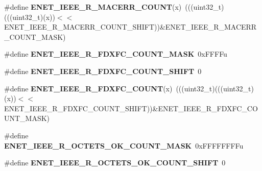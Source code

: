 \begin{DoxyCompactItemize}
\item 
\#define {\bfseries E\+N\+E\+T\+\_\+\+I\+E\+E\+E\+\_\+\+R\+\_\+\+M\+A\+C\+E\+R\+R\+\_\+\+C\+O\+U\+NT}(x)~(((uint32\+\_\+t)(((uint32\+\_\+t)(x))$<$$<$E\+N\+E\+T\+\_\+\+I\+E\+E\+E\+\_\+\+R\+\_\+\+M\+A\+C\+E\+R\+R\+\_\+\+C\+O\+U\+N\+T\+\_\+\+S\+H\+I\+FT))\&E\+N\+E\+T\+\_\+\+I\+E\+E\+E\+\_\+\+R\+\_\+\+M\+A\+C\+E\+R\+R\+\_\+\+C\+O\+U\+N\+T\+\_\+\+M\+A\+SK)\hypertarget{group__ENET__Register__Masks_gaefde5abf1a53c9ab231f653876924e7f}{}\label{group__ENET__Register__Masks_gaefde5abf1a53c9ab231f653876924e7f}

\item 
\#define {\bfseries E\+N\+E\+T\+\_\+\+I\+E\+E\+E\+\_\+\+R\+\_\+\+F\+D\+X\+F\+C\+\_\+\+C\+O\+U\+N\+T\+\_\+\+M\+A\+SK}~0x\+F\+F\+F\+Fu\hypertarget{group__ENET__Register__Masks_gae1bb815cfd879ec0c78889dfcb089247}{}\label{group__ENET__Register__Masks_gae1bb815cfd879ec0c78889dfcb089247}

\item 
\#define {\bfseries E\+N\+E\+T\+\_\+\+I\+E\+E\+E\+\_\+\+R\+\_\+\+F\+D\+X\+F\+C\+\_\+\+C\+O\+U\+N\+T\+\_\+\+S\+H\+I\+FT}~0\hypertarget{group__ENET__Register__Masks_ga31cd2bb10ff9c6d13dc7fede6f4d54d3}{}\label{group__ENET__Register__Masks_ga31cd2bb10ff9c6d13dc7fede6f4d54d3}

\item 
\#define {\bfseries E\+N\+E\+T\+\_\+\+I\+E\+E\+E\+\_\+\+R\+\_\+\+F\+D\+X\+F\+C\+\_\+\+C\+O\+U\+NT}(x)~(((uint32\+\_\+t)(((uint32\+\_\+t)(x))$<$$<$E\+N\+E\+T\+\_\+\+I\+E\+E\+E\+\_\+\+R\+\_\+\+F\+D\+X\+F\+C\+\_\+\+C\+O\+U\+N\+T\+\_\+\+S\+H\+I\+FT))\&E\+N\+E\+T\+\_\+\+I\+E\+E\+E\+\_\+\+R\+\_\+\+F\+D\+X\+F\+C\+\_\+\+C\+O\+U\+N\+T\+\_\+\+M\+A\+SK)\hypertarget{group__ENET__Register__Masks_ga7ca7799d3ca80b9a7927af20025f6cf9}{}\label{group__ENET__Register__Masks_ga7ca7799d3ca80b9a7927af20025f6cf9}

\item 
\#define {\bfseries E\+N\+E\+T\+\_\+\+I\+E\+E\+E\+\_\+\+R\+\_\+\+O\+C\+T\+E\+T\+S\+\_\+\+O\+K\+\_\+\+C\+O\+U\+N\+T\+\_\+\+M\+A\+SK}~0x\+F\+F\+F\+F\+F\+F\+F\+Fu\hypertarget{group__ENET__Register__Masks_gab0a6815c67b330a4261dae4a7da445b5}{}\label{group__ENET__Register__Masks_gab0a6815c67b330a4261dae4a7da445b5}

\item 
\#define {\bfseries E\+N\+E\+T\+\_\+\+I\+E\+E\+E\+\_\+\+R\+\_\+\+O\+C\+T\+E\+T\+S\+\_\+\+O\+K\+\_\+\+C\+O\+U\+N\+T\+\_\+\+S\+H\+I\+FT}~0\hypertarget{group__ENET__Register__Masks_ga8a406cf6c9e91cc4a0217bd3f885ab05}{}\label{group__ENET__Register__Masks_ga8a406cf6c9e91cc4a0217bd3f885ab05}


\end{DoxyCompactItemize}
